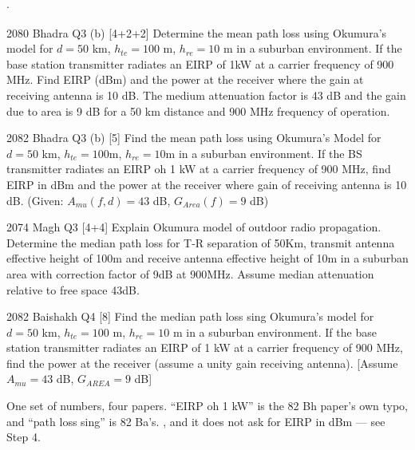 \hr

{\color{sub}\footnotesize {}  \gap$\cdot$\gap {}}

\begin{asked}{2080 Bhadra \textperiodcentered{} Q3 (b) \textperiodcentered{} [4+2+2]}
Determine the mean path loss using Okumura's model for $d = 50$ km, $h_{te} = 100$ m,
$h_{re} = 10$ m in a suburban environment. If the base station transmitter radiates an EIRP of
1kW at a carrier frequency of 900 MHz. Find EIRP (dBm) and the power at the receiver where the
gain at receiving antenna is 10 dB. The medium attenuation factor is 43 dB and the gain due to
area is 9 dB for a 50 km distance and 900 MHz frequency of operation.
\end{asked}
\begin{asked}{2082 Bhadra \textperiodcentered{} Q3 (b) \textperiodcentered{} [5]}
Find the mean path loss using Okumura's Model for $d = 50$ km, $h_{te} = 100$m, $h_{re} = 10$m
in a suburban environment. If the BS transmitter radiates an EIRP oh 1 kW at a carrier frequency
of 900 MHz, find EIRP in dBm and the power at the receiver where gain of receiving antenna is
10 dB. (Given: $A_{mu}(f,d) = 43$ dB, $G_{Area}(f) = 9$ dB)
\end{asked}
\begin{asked}{2074 Magh \textperiodcentered{} Q3 \textperiodcentered{} [4+4]}
Explain Okumura model of outdoor radio propagation. Determine the median path loss for T-R
separation of 50Km, transmit antenna effective height of 100m and receive antenna effective
height of 10m in a suburban area with correction factor of 9dB at 900MHz. Assume median
attenuation relative to free space 43dB.
\end{asked}
\begin{asked}{2082 Baishakh \textperiodcentered{} Q4 \textperiodcentered{} [8]}
Find the median path loss sing Okumura's model for $d = 50$ km, $h_{te} = 100$ m,
$h_{re} = 10$ m in a suburban environment. If the base station transmitter radiates an EIRP of
1 kW at a carrier frequency of 900 MHz, find the power at the receiver (assume a unity gain
receiving antenna). [Assume $A_{mu} = 43$ dB, $G_{AREA} = 9$ dB]
\end{asked}
{\color{sub}\footnotesize One set of numbers, four papers. ``EIRP oh 1 kW'' is the 82 Bh
paper's own typo, and ``path loss sing'' is 82 Ba's. , and it does not ask for EIRP in dBm --- see Step 4.}

